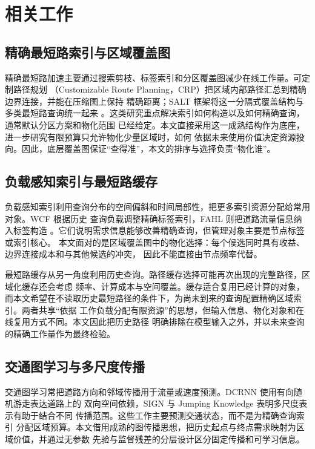 \documentclass[UTF8,a4paper,10pt,twocolumn]{ctexart}
\begin{document}
\section{相关工作}

\subsection{精确最短路索引与区域覆盖图}

精确最短路加速主要通过搜索剪枝、标签索引和分区覆盖图减少在线工作量。可定制路径规划
（Customizable Route Planning，CRP）把区域内部路径汇总到精确边界连接，并能在压缩图上保持
精确距离\citep{delling2017crp}；SALT 框架将这一分隔式覆盖结构与多类最短路查询统一起来
\citep{salt2014}。这类研究重点解决索引如何构造以及如何精确查询，通常默认分区方案和物化范围
已经给定。本文直接采用这一成熟结构作为底座，进一步研究有限预算只允许物化少量区域时，如何
依据未来使用价值决定资源投向。因此，底层覆盖图保证“查得准”，本文的排序与选择负责“物化谁”。

\subsection{负载感知索引与最短路缓存}

负载感知索引利用查询分布的空间偏斜和时间局部性，把更多索引资源分配给常用对象。WCF 根据历史
查询负载调整精确标签索引\citep{wan2022wcf}，FAHL 则把道路流量信息纳入标签构造
\citep{dan2025fahl}。它们说明需求信息能够改善精确查询，但管理对象主要是节点标签或索引核心。
本文面对的是区域覆盖图中的物化选择：每个候选同时具有收益、边界连接成本和与其他候选的冲突，
因此不能直接由节点频率代替。

最短路缓存从另一角度利用历史查询。路径缓存选择可能再次出现的完整路径，区域化缓存还会考虑
频率、计算成本与空间覆盖\citep{thomsen2012cache,li2020cache}。缓存适合复用已经计算的对象，
而本文希望在不读取历史最短路径的条件下，为尚未到来的查询配置精确区域索引。两者共享“依据
工作负载分配有限资源”的思想，但输入信息、物化对象和在线复用方式不同。本文因此把历史路径
明确排除在模型输入之外，并以未来查询的精确工作量作为最终检验。

\subsection{交通图学习与多尺度传播}

交通图学习常把道路方向和邻域传播用于流量或速度预测。DCRNN 使用有向随机游走表达道路上的
双向空间依赖\citep{li2018dcrnn}，SIGN 与 Jumping Knowledge 表明多尺度表示有助于结合不同
传播范围\citep{frasca2020sign,xu2018jk}。这些工作主要预测交通状态，而不是为精确查询索引
分配区域预算。本文借用成熟的图传播思想，把历史起点与终点需求映射为区域价值，并通过无参数
先验与监督残差的分层设计区分固定传播和可学习信息。
\end{document}
